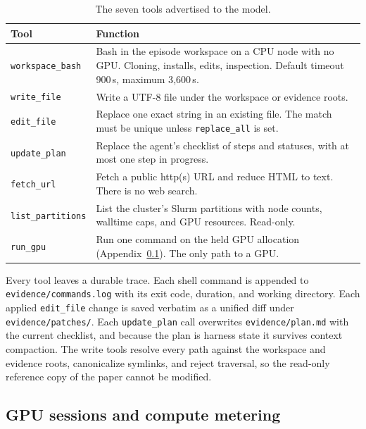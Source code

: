 \documentclass{article} %
\begin{document}
\begin{table}[h]
\caption{The seven tools advertised to the model.}
\label{tab:tools}
\begin{center}
\small
\begin{tabular}{@{}lp{9.6cm}@{}}
\toprule
Tool & Function \\
\midrule
\texttt{workspace\_bash} & Bash in the episode workspace on a CPU node with
no GPU. Cloning, installs, edits, inspection. Default timeout 900\,s,
maximum 3{,}600\,s. \\
\texttt{write\_file} & Write a UTF-8 file under the workspace or evidence
roots. \\
\texttt{edit\_file} & Replace one exact string in an existing file. The
match must be unique unless \texttt{replace\_all} is set. \\
\texttt{update\_plan} & Replace the agent's checklist of steps and statuses,
with at most one step in progress. \\
\texttt{fetch\_url} & Fetch a public http(s) URL and reduce HTML to text.
There is no web search. \\
\texttt{list\_partitions} & List the cluster's Slurm partitions with node
counts, walltime caps, and GPU resources. Read-only. \\
\texttt{run\_gpu} & Run one command on the held GPU allocation
(Appendix~\ref{app:gpu-metering}). The only path to a GPU. \\
\bottomrule
\end{tabular}
\end{center}
\end{table}

Every tool leaves a durable trace. Each shell command is appended to
\texttt{evidence/commands.log} with its exit code, duration, and working
directory. Each applied \texttt{edit\_file} change is saved verbatim as a
unified diff under \texttt{evidence/patches/}. Each \texttt{update\_plan}
call overwrites \texttt{evidence/plan.md} with the current checklist, and
because the plan is harness state it survives context compaction. The write tools
resolve every path against the workspace and evidence roots, canonicalize
symlinks, and reject traversal, so the read-only reference copy of the paper
cannot be modified.

\subsection{GPU sessions and compute metering}
\label{app:gpu-metering}
\end{document}
